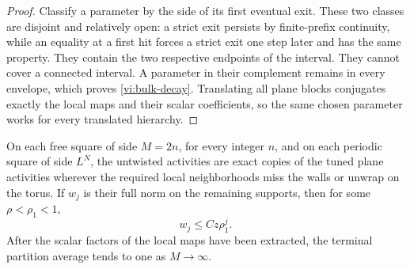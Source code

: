 \begin{proof}
Classify a parameter by the side of its first eventual exit.  These two
classes are disjoint and relatively open: a strict exit persists by
finite-prefix continuity, while an equality at a first hit forces a
strict exit one step later and has the same property.  They contain the
two respective endpoints of the interval.  They cannot cover a connected
interval.  A parameter in their complement remains in every envelope,
which proves \eqref{vi:bulk-decay}.  Translating all plane blocks
conjugates exactly the local maps and their scalar coefficients, so the
same chosen parameter works for every translated hierarchy.
\end{proof}

\begin{proposition}
\label{vi:walls}
On each free square of side $M=2n$, for every integer $n$, and on each
periodic square of side $L^N$, the untwisted activities are exact copies
of the tuned plane activities wherever the required local neighborhoods
miss the walls or unwrap on the torus.  If $w_j$ is their full norm on
the remaining supports, then for some $\rho<\rho_1<1$,
\begin{equation}
 w_j\le Cz\rho_1^j.\label{vi:wall-decay}
\end{equation}
After the scalar factors of the local maps have been extracted, the
terminal partition average tends to one as $M\to\infty$.
\end{proposition}

